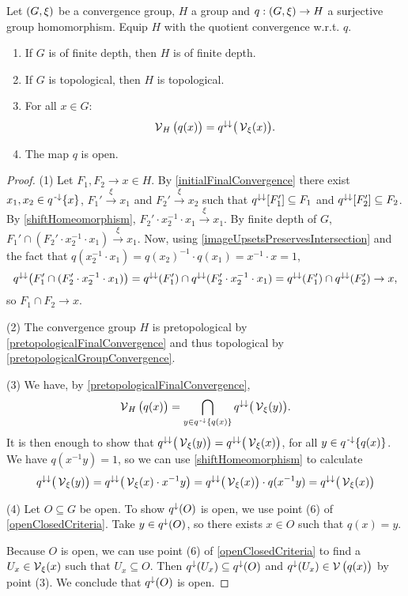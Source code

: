 \begin{proposition} \label{groupHomomorphismQuotient}
Let $\sSet{G, \xi}$ be a convergence group, $H$ a group and $q: \sSet{G, \xi} \to H$ a surjective group homomorphism. Equip $H$ with the quotient convergence w.r.t. $q$.
\begin{enumerate}
\item If $G$ is of finite depth, then $H$ is of finite depth.
\item If $G$ is topological, then $H$ is topological.
\item For all $x\in G$:
\[ \operatorname{\mathcal{V}}_H\big(q(x)\big) = q^{\downarrow\downarrow}\big(\operatorname{\mathcal{V}}_\xi(x)\big). \]
\item The map $q$ is open.
\end{enumerate}
\end{proposition}
\begin{proof}
(1) Let $F_1, F_2 \to x \in H$. By \ref{initialFinalConvergence} there exist $x_1, x_2\in q^{{\text{\hspace{0.15em}-}\downarrow}}\{x\}$, $F_1' \overset{\xi}{\longrightarrow} x_1$ and $F_2' \overset{\xi}{\longrightarrow} x_2$ such that $q^{\downarrow\downarrow}[F'_1] \subseteq F_1$ and $q^{\downarrow\downarrow}[F'_2] \subseteq F_2$. By \ref{shiftHomeomorphism}, $F_2'\cdot x_2^{-1}\cdot x_1 \overset{\xi}{\longrightarrow} x_1$. By finite depth of $G$, $F_1'\cap (F_2'\cdot x_2^{-1}\cdot x_1) \overset{\xi}{\longrightarrow} x_1$. Now, using \ref{imageUpsetsPreservesIntersection} and the fact that $q(x_2^{-1}\cdot x_1) = q(x_2)^{-1}\cdot q(x_1) = x^{-1}\cdot x = 1$,
\[ q^{\downarrow\downarrow}\big(F_1'\cap (F_2'\cdot x_2^{-1}\cdot x_1)\big) = q^{\downarrow\downarrow}(F_1')\cap q^{\downarrow\downarrow}(F_2'\cdot x_2^{-1}\cdot x_1) = q^{\downarrow\downarrow}(F_1')\cap q^{\downarrow\downarrow}(F_2') \to x, \]
so $F_1\cap F_2 \to x$.

(2) The convergence group $H$ is pretopological by \ref{pretopologicalFinalConvergence} and thus topological by \ref{pretopologicalGroupConvergence}.

(3) We have, by \ref{pretopologicalFinalConvergence},
\[ \operatorname{\mathcal{V}}_H\big(q(x)\big) = \bigcap_{y\in q^{{\text{\hspace{0.15em}-}\downarrow}}\{q(x)\}}q^{\downarrow\downarrow}\big(\operatorname{\mathcal{V}}_\xi(y)\big). \]
It is then enough to show that $q^{\downarrow\downarrow}\big(\operatorname{\mathcal{V}}_\xi(y)\big) = q^{\downarrow\downarrow}\big(\operatorname{\mathcal{V}}_\xi(x)\big)$, for all $y\in q^{{\text{\hspace{0.15em}-}\downarrow}}\{q(x)\}$. We have $q(x^{-1}y) = 1$, so we can use \ref{shiftHomeomorphism} to calculate
\[ q^{\downarrow\downarrow}\big(\operatorname{\mathcal{V}}_\xi(y)\big) = q^{\downarrow\downarrow}\big(\operatorname{\mathcal{V}}_\xi(x)\cdot x^{-1}y\big) = q^{\downarrow\downarrow}\big(\operatorname{\mathcal{V}}_\xi(x)\big)\cdot q(x^{-1}y) = q^{\downarrow\downarrow}\big(\operatorname{\mathcal{V}}_\xi(x)\big) \]

(4) Let $O\subseteq G$ be open. To show $q^\downarrow(O)$ is open, we use point (6) of \ref{openClosedCriteria}. Take $y\in q^{\downarrow}(O)$, so there exists $x\in O$ such that $q(x) = y$.

Because $O$ is open, we can use point (6) of \ref{openClosedCriteria} to find a $U_x\in \operatorname{\mathcal{V}}_\xi(x)$ such that $U_x \subseteq O$. Then $q^{\downarrow}(U_x) \subseteq q^\downarrow(O)$ and $q^{\downarrow}(U_x)\in \operatorname{\mathcal{V}}\big(q(x)\big)$ by point (3). We conclude that $q^{\downarrow}(O)$ is open.
\end{proof}

